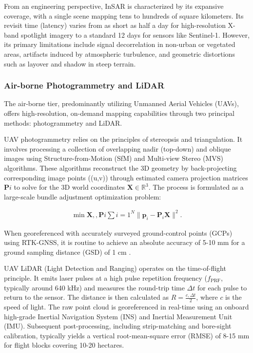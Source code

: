 \documentclass[preprint,11pt,authoryear,3p]{elsarticle}
\begin{document}
From an engineering perspective, InSAR is characterized by its expansive coverage, with a single scene mapping tens to hundreds of square kilometers. Its revisit time (latency) varies from as short as half a day for high-resolution X-band spotlight imagery to a standard 12 days for sensors like Sentinel-1. However, its primary limitations include signal decorrelation in non-urban or vegetated areas, artifacts induced by atmospheric turbulence, and geometric distortions such as layover and shadow in steep terrain.


\subsubsection{Air-borne Photogrammetry and LiDAR}

The air-borne tier, predominantly utilizing Unmanned Aerial Vehicles (UAVs), offers high-resolution, on-demand mapping capabilities through two principal methods: photogrammetry and LiDAR.

UAV photogrammetry relies on the principles of stereopsis and triangulation. It involves processing a collection of overlapping nadir (top-down) and oblique images using Structure-from-Motion (SfM) and Multi-view Stereo (MVS) algorithms. These algorithms reconstruct the 3D geometry by back-projecting corresponding image points ((u,v)) through estimated camera projection matrices $\mathbf{P}i$ to solve for the 3D world coordinates $\mathbf{X} \in \mathbb{R}^3$. The process is formulated as a large-scale bundle adjustment optimization problem:

\begin{align}
    \min{\mathbf{X},,{\mathbf{P}i}}
    \sum{i=1}^{N} \lVert \mathbf{p}_i - \mathbf{P}_i\mathbf{X} \rVert^2.
\end{align}

When georeferenced with accurately surveyed ground-control points (GCPs) using RTK-GNSS, it is routine to achieve an absolute accuracy of 5-10 mm for a ground sampling distance (GSD) of 1 cm \citep{nwaogu2023application}.

UAV LiDAR (Light Detection and Ranging) operates on the time-of-flight principle. It emits laser pulses at a high pulse repetition frequency ($f_{\text{PRF}}$, typically around 640 kHz) and measures the round-trip time $\Delta t$ for each pulse to return to the sensor. The distance is then calculated as $R = \tfrac{c,\Delta t}{2}$, where $c$ is the speed of light. The raw point cloud is georeferenced in real-time using an onboard high-grade Inertial Navigation System (INS) and Inertial Measurement Unit (IMU). Subsequent post-processing, including strip-matching and bore-sight calibration, typically yields a vertical root-mean-square error (RMSE) of 8-15 mm for flight blocks covering 10-20 hectares.
\end{document}
